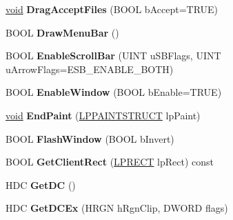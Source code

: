 \begin{DoxyCompactItemize}
\item 
\mbox{\label{class_a_t_l_1_1_c_window_a8d01785cf26dc966a16bec4a13f726c1}} 
\hyperlink{interfacevoid}{void} {\bfseries Drag\+Accept\+Files} (B\+O\+OL b\+Accept=T\+R\+UE)
\item 
\mbox{\label{class_a_t_l_1_1_c_window_a478f0446e716422c6cc427bec060e124}} 
B\+O\+OL {\bfseries Draw\+Menu\+Bar} ()
\item 
\mbox{\label{class_a_t_l_1_1_c_window_a9ab5a59490cbe86de8a328edb0cc0353}} 
B\+O\+OL {\bfseries Enable\+Scroll\+Bar} (U\+I\+NT u\+S\+B\+Flags, U\+I\+NT u\+Arrow\+Flags=E\+S\+B\+\_\+\+E\+N\+A\+B\+L\+E\+\_\+\+B\+O\+TH)
\item 
\mbox{\label{class_a_t_l_1_1_c_window_aefc633a27ed42cc6759cb1d27b23b622}} 
B\+O\+OL {\bfseries Enable\+Window} (B\+O\+OL b\+Enable=T\+R\+UE)
\item 
\mbox{\label{class_a_t_l_1_1_c_window_a455f30f2c805aecc167b4cfe00de3bbe}} 
\hyperlink{interfacevoid}{void} {\bfseries End\+Paint} (\hyperlink{structtag_p_a_i_n_t_s_t_r_u_c_t}{L\+P\+P\+A\+I\+N\+T\+S\+T\+R\+U\+CT} lp\+Paint)
\item 
\mbox{\label{class_a_t_l_1_1_c_window_a21b7d3e1376db3f2cc68f4b700051be1}} 
B\+O\+OL {\bfseries Flash\+Window} (B\+O\+OL b\+Invert)
\item 
\mbox{\label{class_a_t_l_1_1_c_window_a7b7db52941776a9b90c439c19dca9b48}} 
B\+O\+OL {\bfseries Get\+Client\+Rect} (\hyperlink{structtag_r_e_c_t}{L\+P\+R\+E\+CT} lp\+Rect) const
\item 
\mbox{\label{class_a_t_l_1_1_c_window_a24083add8d84d88a65f975e12dd0ca88}} 
H\+DC {\bfseries Get\+DC} ()
\item 
\mbox{\label{class_a_t_l_1_1_c_window_ab4a4fa3fc7db2e5118928f23c7fb002d}} 
H\+DC {\bfseries Get\+D\+C\+Ex} (H\+R\+GN h\+Rgn\+Clip, D\+W\+O\+RD flags)
\item 
\mbox{\label{class_a_t_l_1_1_c_window_a7dcd4f2178a02474b2a31f6f8c33f0e9}} 

\end{DoxyCompactItemize}
